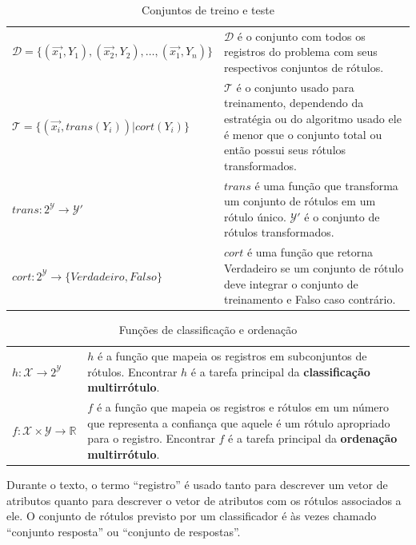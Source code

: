 \documentclass[runningheads,a4paper]{llncs}
\begin{document}
\begin{table}
	\centering
	\begin{tabular}{| >{\centering}p{6cm} | m{6cm} |}
		\hline	
		\multicolumn{2}{|c|}{\textit{Conjuntos de treino e teste}} \\
		\hline
		$\mathcal{D} = \{(\vec{x_1}, Y_1), (\vec{x_2}, Y_2), \dots, (\vec{x_1}, Y_n)\}$ & $\mathcal{D}$ é o conjunto com todos os registros do problema com seus respectivos conjuntos de rótulos. \\
		\hline
		$\mathcal{T} = \{(\vec{x_i}, trans(Y_i)) | cort(Y_i) \}$ & $\mathcal{T}$ é o conjunto usado para treinamento, dependendo da estratégia ou do algoritmo usado ele é menor que o conjunto total ou então possui seus rótulos transformados. \\
		\hline
		$trans : 2^\mathcal{Y} \to \mathcal{Y'}$ & $trans$ é uma função que transforma um conjunto de rótulos em um rótulo único. $\mathcal{Y'}$ é o conjunto de rótulos transformados. \\
		\hline
		$cort : 2^\mathcal{Y} \to \{Verdadeiro, Falso\}$ & $cort$ é uma função que retorna Verdadeiro se um conjunto de rótulo deve integrar o conjunto de treinamento e Falso caso contrário. \\
		\hline
	\end{tabular}
	\caption{Conjuntos de treino e teste}
	\label{tab:matematica-dominio}
\end{table}

\begin{table}
	\centering
	\begin{tabular}{| >{\centering}p{4cm} | m{8cm} |}
		\hline
		\multicolumn{2}{|c|}{\textit{Funções}} \\
		\hline
		$h : \mathcal{X} \to 2^\mathcal{Y}$ & $h$ é a função que mapeia os registros em subconjuntos de rótulos. Encontrar $h$ é a tarefa principal da \textbf{classificação multirrótulo}. \\
		\hline
		$f : \mathcal{X} \times \mathcal{Y} \to \mathbb{R}$ & $f$ é a função que mapeia os registros e rótulos em um número que representa a confiança que aquele é um rótulo apropriado para o registro. Encontrar $f$ é a tarefa principal da \textbf{ordenação multirrótulo}. \\
		\hline
	\end{tabular}
	\caption{Funções de classificação e ordenação}
	\label{tab:matematica-funcoes}
\end{table}	

Durante o texto, o termo \enquote{registro} é usado tanto para descrever um vetor de atributos quanto para descrever o vetor de atributos com os rótulos associados a ele. O conjunto de rótulos previsto por um classificador é às vezes chamado \enquote{conjunto resposta} ou \enquote{conjunto de respostas}.
\end{document}
